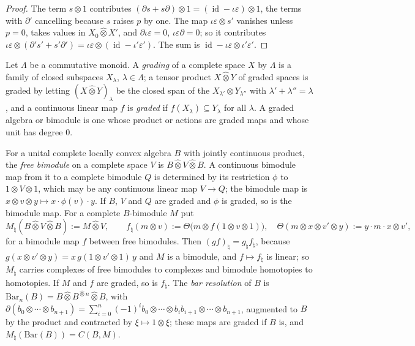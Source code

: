 \documentclass[11pt]{amsart}
\theoremstyle{definition}
\theoremstyle{remark}
\newcommand{\id}{\operatorname{id}}
\begin{document}
\begin{proof}
The term $s\otimes1$ contributes $(\partial s+s\partial)\otimes1=
(\id-\iota\varepsilon)\otimes1$, the terms with $\partial'$ cancelling because
$s$ raises $p$ by one.  The map $\iota\varepsilon\otimes s'$ vanishes unless
$p=0$, takes values in $X_0\widehat\otimes X'$, and $\partial\iota\varepsilon=0$,
$\iota\varepsilon\partial=0$; so it contributes
$\iota\varepsilon\otimes(\partial's'+s'\partial')=\iota\varepsilon\otimes
(\id-\iota'\varepsilon')$.  The sum is $\id-\iota\varepsilon\otimes\iota'\varepsilon'$.
\end{proof}

Let $\Lambda$ be a commutative monoid.  A \emph{grading} of a complete space
$X$ by $\Lambda$ is a family of closed subspaces $X_{\lambda}$,
$\lambda\in\Lambda$; a tensor product $X\widehat\otimes Y$ of graded spaces is
graded by letting $(X\widehat\otimes Y)_{\lambda}$ be the closed span of the
$X_{\lambda'}\otimes Y_{\lambda''}$ with $\lambda'+\lambda''=\lambda$, and a continuous linear
map $f$ is \emph{graded} if $f(X_{\lambda})\subseteq Y_{\lambda}$ for all
$\lambda$.  A graded algebra or bimodule is one whose product or actions are
graded maps and whose unit has degree $0$.

For a unital complete locally convex algebra $B$ with jointly continuous
product, the \emph{free bimodule} on a complete space $V$ is
$B\widehat\otimes V\widehat\otimes B$.  A continuous bimodule map from it to a
complete bimodule $Q$ is determined by its restriction $\phi$ to
$1\otimes V\otimes1$, which may be any continuous linear map $V\to Q$; the
bimodule map is $x\otimes v\otimes y\mapsto x\cdot\phi(v)\cdot y$.  If $B$,
$V$ and $Q$ are graded and $\phi$ is graded, so is the bimodule map.  For a
complete $B$-bimodule $M$ put
\[
M_{\natural}(B\widehat\otimes V\widehat\otimes B):=M\widehat\otimes V,\qquad
f_{\natural}(m\otimes v):=\Theta\bigl(m\otimes f(1\otimes v\otimes1)\bigr),\quad
\Theta(m\otimes x\otimes v'\otimes y):=y\cdot m\cdot x\otimes v',
\]
for a bimodule map $f$ between free bimodules.  Then $(gf)_{\natural}=
g_{\natural}f_{\natural}$, because $g(x\otimes v'\otimes y)=x\,g(1\otimes
v'\otimes1)\,y$ and $M$ is a bimodule, and $f\mapsto f_{\natural}$ is linear;
so $M_{\natural}$ carries complexes of free bimodules to complexes and
bimodule homotopies to homotopies.  If $M$ and $f$ are graded, so is
$f_{\natural}$.  The \emph{bar resolution} of $B$ is
$\mathrm{Bar}_n(B)=B\widehat\otimes B^{\widehat\otimes n}\widehat\otimes B$,
with $\partial(b_0\otimes\cdots\otimes b_{n+1})=\sum_{i=0}^{n}(-1)^{i}b_0\otimes
\cdots\otimes b_ib_{i+1}\otimes\cdots\otimes b_{n+1}$, augmented to $B$ by the
product and contracted by $\xi\mapsto1\otimes\xi$; these maps are graded if $B$
is, and $M_{\natural}(\mathrm{Bar}(B))=C(B,M)$.
\end{document}
